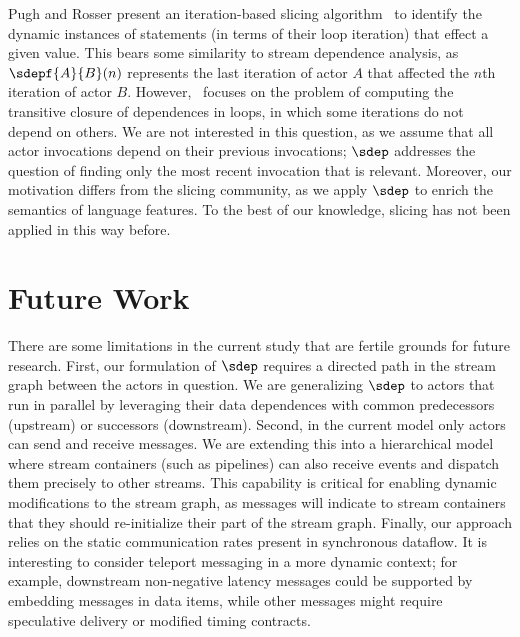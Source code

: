 Pugh and Rosser present an iteration-based slicing
algorithm~\cite{pugh97slice} to identify the dynamic instances of
statements (in terms of their loop iteration) that effect a given
value.  This bears some similarity to stream dependence analysis, as
$\sdepf{A}{B}(n)$ represents the last iteration of actor $A$ that
affected the $n$th iteration of actor $B$.
However,~\cite{pugh97slice} focuses on the problem of computing the
transitive closure of dependences in loops, in which some iterations
do not depend on others.  We are not interested in this question, as
we assume that all actor invocations depend on their previous
invocations; $\sdep$ addresses the question of finding only the most
recent invocation that is relevant.  Moreover, our motivation differs
from the slicing community, as we apply $\sdep$ to enrich the
semantics of language features.  To the best of our knowledge, slicing
has not been applied in this way before.

\section{Future Work}
\label{sec:messaging-future}

There are some limitations in the current study that are fertile
grounds for future research.  First, our formulation of $\sdep$
requires a directed path in the stream graph between the actors in
question.  We are generalizing $\sdep$ to actors that run in parallel
by leveraging their data dependences with common predecessors
(upstream) or successors (downstream).  Second, in the current model
only actors can send and receive messages.  We are extending this into
a hierarchical model where stream containers (such as pipelines) can
also receive events and dispatch them precisely to other streams.
This capability is critical for enabling dynamic modifications to the
stream graph, as messages will indicate to stream containers that they
should re-initialize their part of the stream graph.  Finally, our
approach relies on the static communication rates present in
synchronous dataflow.  It is interesting to consider teleport
messaging in a more dynamic context; for example, downstream
non-negative latency messages could be supported by embedding messages
in data items, while other messages might require speculative delivery
or modified timing contracts.

